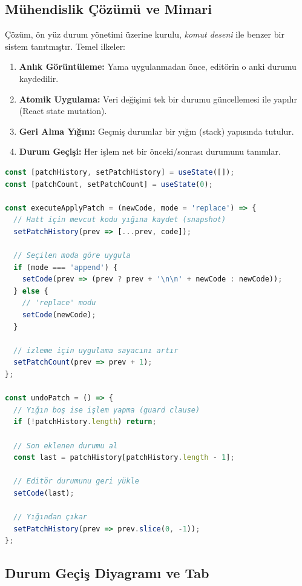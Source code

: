 \documentclass[12pt,a4paper]{article}
\begin{document}
\subsection{Mühendislik Çözümü ve Mimari}

Çözüm, ön yüz durum yönetimi üzerine kurulu, \textit{komut deseni} ile benzer bir sistem tanıtmıştır. Temel ilkeler:

\begin{enumerate}[leftmargin=*]
  \item \textbf{Anlık Görüntüleme:} Yama uygulanmadan önce, editörin o anki durumu kaydedilir.
  \item \textbf{Atomik Uygulama:} Veri değişimi tek bir durumu güncellemesi ile yapılır (React state mutation).
  \item \textbf{Geri Alma Yığını:} Geçmiş durumlar bir yığın (stack) yapısında tutulur.
  \item \textbf{Durum Geçişi:} Her işlem net bir önceki/sonrası durumunu tanımlar.
\end{enumerate}

\begin{lstlisting}[language=JavaScript, caption=Yama Uygulaması: Ana Mantık Yapısı]
const [patchHistory, setPatchHistory] = useState([]);
const [patchCount, setPatchCount] = useState(0);

const executeApplyPatch = (newCode, mode = 'replace') => {
  // Hatt için mevcut kodu yığına kaydet (snapshot)
  setPatchHistory(prev => [...prev, code]);
  
  // Seçilen moda göre uygula
  if (mode === 'append') {
    setCode(prev => (prev ? prev + '\n\n' + newCode : newCode));
  } else {
    // 'replace' modu
    setCode(newCode);
  }
  
  // izleme için uygulama sayacını artır
  setPatchCount(prev => prev + 1);
};

const undoPatch = () => {
  // Yığın boş ise işlem yapma (guard clause)
  if (!patchHistory.length) return;
  
  // Son eklenen durumu al
  const last = patchHistory[patchHistory.length - 1];
  
  // Editör durumunu geri yükle
  setCode(last);
  
  // Yığından çıkar
  setPatchHistory(prev => prev.slice(0, -1));
};
\end{lstlisting}

\subsection{Durum Geçiş Diyagramı ve Tab}
\end{document}
